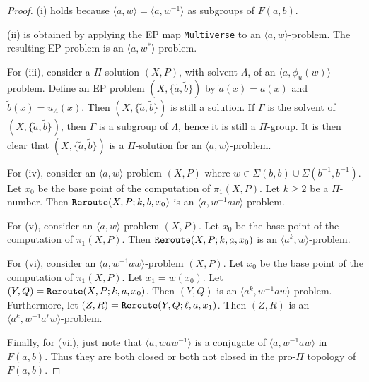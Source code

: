 \documentclass[11pt]{amsart}
\theoremstyle{definition}
\theoremstyle{definition}
\numberwithin{equation}{section}
\begin{document}
\begin{proof} (i) holds because $\langle a, w\rangle=\langle a, w^{-1}\rangle$ as subgroups of $F(a,b)$. 

(ii) is obtained by applying the EP map {\tt Multiverse} to an $\langle a, w\rangle$-problem. The resulting EP problem is an $\langle a, w^*\rangle$-problem. 

For (iii),  consider a $\Pi$-solution $(X, P)$, with solvent $\Lambda$, of an $\langle a, \phi_u(w)\rangle$-problem. Define an EP problem $(X, \{\tilde{a}, \tilde{b}\})$ by $\tilde{a}(x)=a(x)$ and $\tilde{b}(x)=u_\Lambda(x)$. Then $(X, \{\tilde{a}, \tilde{b}\})$ is still a solution. If $\Gamma$ is the solvent of $(X, \{\tilde{a}, \tilde{b}\})$, then $\Gamma$ is a subgroup of $\Lambda$, hence it is still a $\Pi$-group. It is then clear that $(X, \{\tilde{a}, \tilde{b}\})$ is a $\Pi$-solution for an $\langle a, w\rangle$-problem.

For (iv), consider an $\langle a, w\rangle$-problem $(X, P)$ where $w\in \Sigma(b,b)\cup \Sigma(b^{-1},b^{-1})$. Let $x_0$ be the base point of the computation of $\pi_1(X, P)$. Let $k\geq 2$ be a $\Pi$-number. Then ${\tt Reroute}(X, P; k, b, x_0)$ is an $\langle a, w^{-1}aw\rangle$-problem. 

For (v), consider an $\langle a, w\rangle$-problem $(X, P)$. Let $x_0$ be the base point of the computation of $\pi_1(X, P)$. Then ${\tt Reroute}(X, P; k, a, x_0)$ is an $\langle a^k, w\rangle$-problem. 

For (vi), consider an $\langle a, w^{-1}aw\rangle$-problem $(X, P)$. Let $x_0$ be the base point of the computation of $\pi_1(X, P)$. Let $x_1=w(x_0)$. Let $(Y, Q)={\tt Reroute}(X, P; k, a, x_0)$. Then $(Y, Q)$ is an $\langle a^k, w^{-1}aw\rangle$-problem. Furthermore, let $(Z, R)={\tt Reroute}(Y, Q; \ell, a, x_1)$. Then $(Z, R)$ is an $\langle a^k, w^{-1}a^{\ell}w\rangle$-problem.

Finally, for (vii), just note that $\langle a, waw^{-1}\rangle$ is a conjugate of $\langle a, w^{-1}aw\rangle$ in $F(a, b)$. Thus they are both closed or both not closed in the pro-$\Pi$ topology of $F(a, b)$.
\end{proof}
\end{document}
